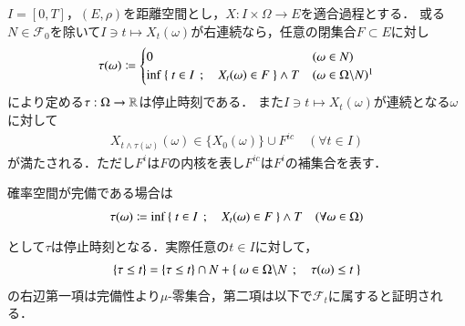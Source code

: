 	\begin{screen}
		\begin{thm}[閉集合と停止時刻]
			$I = [0,T]$，$(E,\rho)$を距離空間とし，$X:I \times \Omega \rightarrow E$を適合過程とする．
			或る$N \in \mathcal{F}_0$を除いて$I \ni t \longmapsto X_t(\omega)$が右連続なら，任意の閉集合$F \subset E$に対し
			\begin{align}
				\tau(\omega) \coloneqq
				\begin{cases}
					0 & (\omega \in N) \\
					\inf{}{\Set{t \in I}{X_t(\omega) \in F}} \wedge T & (\omega \in \Omega \backslash N) \footnotemark
				\end{cases}
			\end{align}
			により定める$\tau:\Omega \rightarrow \mathbb{R}$は停止時刻である．
			また$I \ni t \longmapsto X_t(\omega)$が連続となる$\omega$に対して
			\begin{align}
				X_{t \wedge \tau(\omega)}(\omega) \in \{ X_0(\omega) \} \cup F^{ic} \quad (\forall t \in I)
			\end{align}
			が満たされる．ただし$F^i$は$F$の内核を表し$F^{ic}$は$F^i$の補集合を表す．
			\label{thm:closed_set_stopping_time}
		\end{thm}
	\end{screen}
	確率空間が完備である場合は
	\begin{align}
		\tau(\omega) \coloneqq \operatorname*{inf}_{} \left\{\ t \in I\ \, ; \quad X_t(\omega) \in F\ \right\} \wedge T
		\quad (\forall \omega \in \Omega)
	\end{align}
	として$\tau$は停止時刻となる．実際任意の$t \in I$に対して，
	\begin{align}
		\{\tau \leq t\} = \{\tau \leq t\} \cap N + \left\{\ \omega \in \Omega \backslash N\ \, ; \quad \tau(\omega) \leq t\ \right\}
	\end{align}
	の右辺第一項は完備性より$\mu$-零集合，第二項は以下で$\mathcal{F}_t$に属すると証明される．

